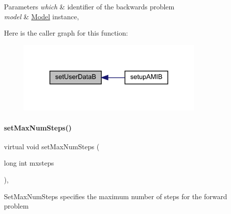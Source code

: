 \begin{DoxyParams}{Parameters}
{\em which} & identifier of the backwards problem \\
\hline
{\em model} & \mbox{\hyperlink{classamici_1_1_model}{Model}} instance, \\
\hline
\end{DoxyParams}
Here is the caller graph for this function\+:
\nopagebreak
\begin{figure}[H]
\begin{center}
\leavevmode
\includegraphics[width=259pt]{classamici_1_1_solver_ac5c347a985fa73861a88e76c7b9904f8_icgraph}
\end{center}
\end{figure}
\mbox{\label{classamici_1_1_solver_a29f208ce304b01c8fe294ab9143a98e5}} 
\paragraph{\texorpdfstring{set\+Max\+Num\+Steps()}{setMaxNumSteps()}}
{\footnotesize\ttfamily virtual void set\+Max\+Num\+Steps (\begin{DoxyParamCaption}\item[{long int}]{mxsteps }\end{DoxyParamCaption})\hspace{0.3cm}{\ttfamily [protected]}, {}}

Set\+Max\+Num\+Steps specifies the maximum number of steps for the forward problem


